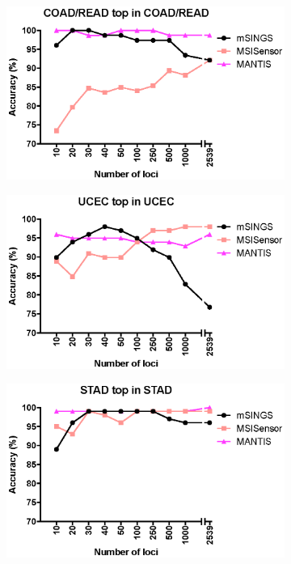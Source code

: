 \begin{figure}[p]
	\centering
	\begin{subfigure}{0.33\textwidth}
		\includegraphics[width=\linewidth,keepaspectratio]{images/msilandscape/tool_performance_coadread_loci_coadread}
		\caption{}\label{fig:msilandscape:tool_performance_coadread_loci_coadread}
	\end{subfigure}%
	\hfill%
	\begin{subfigure}{0.33\textwidth}
		\includegraphics[width=\linewidth,keepaspectratio]{images/msilandscape/tool_performance_ucec_loci_ucec}
		\caption{}\label{fig:msilandscape:tool_performance_ucec_loci_ucec}
	\end{subfigure}%
	\hfill%
	\begin{subfigure}{0.33\textwidth}
		\includegraphics[width=\linewidth,keepaspectratio]{images/msilandscape/tool_performance_stad_loci_stad}

\end{subfigure}
\end{figure}
